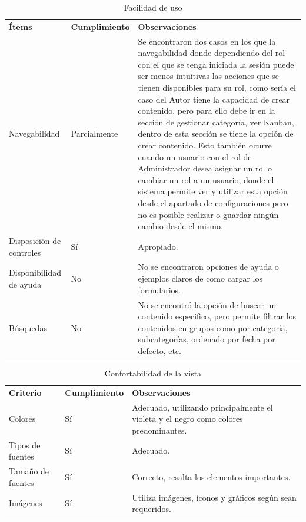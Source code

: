 \documentclass[10pt,times,twocolumn]{article}
\begin{document}
\begin{table}[H]
    \centering
    \begin{tabular}{p{2cm}p{2cm}p{3cm}}
        \rowcolor{gray!15}
        \textbf{Ítems} & \textbf{Cumplimiento} & \textbf{Observaciones} \\
        Navegabilidad & Parcialmente & Se encontraron dos casos en los que la navegabilidad donde dependiendo del rol con el que se tenga iniciada la sesión puede ser menos intuitivas las acciones que se tienen disponibles para su rol, como sería el caso del Autor tiene la capacidad de crear contenido, pero para ello debe ir en la sección de  gestionar categoría, ver Kanban, dentro de esta sección se tiene la opción de crear contenido. Esto también ocurre cuando un usuario con el rol de Administrador desea asignar un rol o cambiar un rol a un usuario, donde el sistema permite ver y utilizar esta opción desde el apartado de configuraciones pero no es posible realizar o guardar ningún cambio desde el mismo. \\
       	Disposición de controles & Sí & Apropiado. \\
       	Disponibilidad de ayuda & No & No se encontraron opciones de ayuda o ejemplos claros de como cargar los formularios. \\
       	Búsquedas & No & No se encontró la opción de buscar un contenido especifico, pero permite filtrar los contenidos en grupos como por categoría, subcategorías, ordenado por fecha por defecto, etc. \\
    \end{tabular}
    \caption{Facilidad de uso}
    \label{tab:facilidad_de_uso}
\end{table}

\begin{table}[H]
    \centering
    \begin{tabular}{p{2cm}p{2cm}p{3cm}}
        \rowcolor{gray!15}
        \textbf{Criterio} & \textbf{Cumplimiento} & \textbf{Observaciones} \\
        Colores & Sí & Adecuado, utilizando principalmente el violeta y el negro como colores predominantes. \\
        Tipos de fuentes & Sí & Adecuado. \\
        Tamaño de fuentes & Sí & Correcto, resalta los elementos importantes. \\
        Imágenes & Sí & Utiliza imágenes, íconos y gráficos según sean requeridos. \\
    \end{tabular}
    \caption{Confortabilidad de la vista}
    \label{tab:confortabilidad_de_la_vista}
\end{table}
\end{document}
